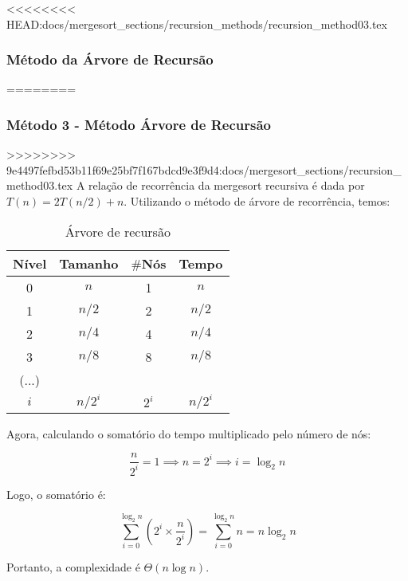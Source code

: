 <<<<<<<< HEAD:docs/mergesort_sections/recursion_methods/recursion_method03.tex
\subsubsection{Método da Árvore de Recursão}
========
\subsubsection{Método 3 - Método Árvore de Recursão}
>>>>>>>> 9e4497fefbd53b11f69e25bf7f167bdcd9e3f9d4:docs/mergesort_sections/recursion_method03.tex
A relação de recorrência da mergesort recursiva é dada por $T(n) = 2T(n/2) + n$. Utilizando o método de árvore de recorrência, temos:

\begin{table}[ht!]
    \centering
    \begin{tabular}{|c|c|c|c|}
    \hline
    \textbf{Nível} & \textbf{Tamanho} & $\#$\textbf{Nós} & \textbf{Tempo} \\ \hline
     0 & $n$ & 1 & $n$ \\ \hline
     1 & $n/2$ & 2 & $n/2$ \\ \hline
     2 & $n/4$ & 4 & $n/4$ \\ \hline
     3 & $n/8$ & 8 & $n/8$ \\ \hline
     (...) & & & \\ \hline
     $i$ & $n/2^i$ & $2^i$ & $n/2^i$ \\ \hline 
    \end{tabular}  
    \caption{Árvore de recursão}
\end{table}

Agora, calculando o somatório do tempo multiplicado pelo número de nós:

\[
\frac{n}{2^i} = 1 \implies n = 2^i \implies i = \log_2{n}
\]

Logo, o somatório é:

\[
\sum_{i=0}^{\log_2{n}} \left( 2^i \times \frac{n}{2^i} \right) = \sum_{i=0}^{\log_2{n}} n = n \log_2{n}
\]

Portanto, a complexidade é $\Theta(n \log n)$.
